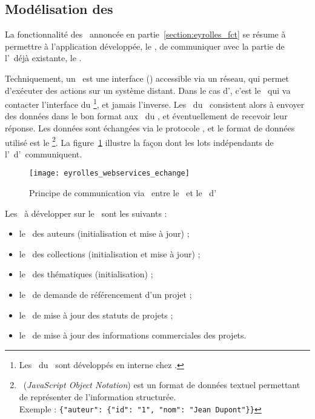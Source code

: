 \subsection{Modélisation des \awss}
\label{section:eyrolles_webservices}

La fonctionnalité des \awss\ annoncée en partie~\ref{section:eyrolles_fct} se résume à permettre à l'application développée, le \alotdeux, de communiquer avec la partie de l'\aintranet\ déjà existante, le \alotun.

Techniquement, un \aws\ est une interface (\aapi) accessible via un réseau, qui permet d'exécuter des actions sur un système distant. Dans le cas d'\aey, c'est le \alotdeux\ qui va contacter l'interface du \alotun\footnote{Les \awss\ du \alotun\ sont développés en interne chez \aey.}, et jamais l'inverse. Les \awss\ du \alotdeux\ consistent alors à envoyer des données dans le bon format aux \awss\ du \alotun, et éventuellement de recevoir leur réponse. Les données sont échangées via le protocole \ahttp, et le format de données utilisé est le \ajson\footnote{\ajson\ (\textit{JavaScript Object Notation}) est un format de données textuel permettant de représenter de l'information structurée.~\cite{json}\\Exemple : \texttt{\{"auteur": \{"id": "1", "nom": "Jean Dupont"\}\}}}. La figure~\ref{figure:eyrolles_webservices_echange} illustre la façon dont les lots indépendants de l'\aintranet\ d'\aey\ communiquent.

\begin{figure}
	\centering
	\texttt{[image: eyrolles\_webservices\_echange]}
	\caption{Principe de communication via \aws\ entre le \alotun\ et le \alotdeux\ d'\aey}
	\label{figure:eyrolles_webservices_echange}
\end{figure}

Les \awss\ à développer sur le \alotdeux\ sont les suivants :

\begin{itemize}
	\item le \aws\ des auteurs (initialisation et mise à jour) ;
	\item le \aws\ des collections (initialisation et mise à jour) ;
	\item le \aws\ des thématiques (initialisation) ;
	\item le \aws\ de demande de référencement d'un projet ;
	\item le \aws\ de mise à jour des statuts de projets ;
	\item le \aws\ de mise à jour des informations commerciales des projets.
\end{itemize}

